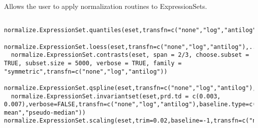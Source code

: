 \begin{Description}\relax
Allows the user to apply normalization routines to ExpressionSets.
\end{Description}
\begin{Usage}
\begin{verbatim}
  normalize.ExpressionSet.quantiles(eset,transfn=c("none","log","antilog"))
  normalize.ExpressionSet.loess(eset,transfn=c("none","log","antilog"),...)
  normalize.ExpressionSet.contrasts(eset, span = 2/3, choose.subset = TRUE, subset.size = 5000, verbose = TRUE, family = "symmetric",transfn=c("none","log","antilog"))
  normalize.ExpressionSet.qspline(eset,transfn=c("none","log","antilog"),...)
  normalize.ExpressionSet.invariantset(eset,prd.td = c(0.003, 0.007),verbose=FALSE,transfn=c("none","log","antilog"),baseline.type=c("mean","median","pseudo-mean","pseudo-median"))
normalize.ExpressionSet.scaling(eset,trim=0.02,baseline=-1,transfn=c("none","log","antilog"))
\end{verbatim}
\end{Usage}
